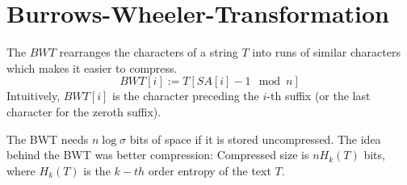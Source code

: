 \section{Burrows-Wheeler-Transformation}

\begin{Definition}
  The  $BWT$ rearranges the characters of a string $T$ into runs of similar characters which makes it easier to compress.
  \begin{equation}
    BWT[i] := T[SA[i] - 1 \mod n]
  \end{equation}
  Intuitively, $BWT[i]$ is the character preceding the $i$-th suffix (or the last character for the zeroth suffix).
\end{Definition}

The BWT needs $n\log\sigma$ bits of space if it is stored uncompressed. The idea behind the BWT was better compression: Compressed size is $nH_k(T)$ bits, where $H_k(T)$ is the $k-th$ order entropy of the text $T$.

